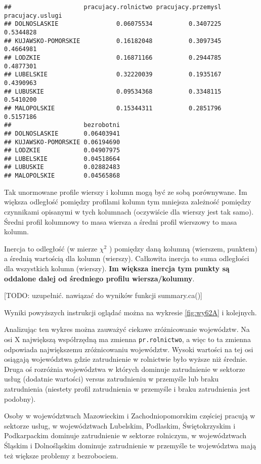 \documentclass[polish,]{book}
\begin{document}
\begin{verbatim}
##                    pracujacy.rolnictwo pracujacy.przemysl pracujacy.uslugi
## DOLNOSLASKIE                0.06075534          0.3407225        0.5344828
## KUJAWSKO-POMORSKIE          0.16182048          0.3097345        0.4664981
## LODZKIE                     0.16871166          0.2944785        0.4877301
## LUBELSKIE                   0.32220039          0.1935167        0.4390963
## LUBUSKIE                    0.09534368          0.3348115        0.5410200
## MALOPOLSKIE                 0.15344311          0.2851796        0.5157186
##                    bezrobotni
## DOLNOSLASKIE       0.06403941
## KUJAWSKO-POMORSKIE 0.06194690
## LODZKIE            0.04907975
## LUBELSKIE          0.04518664
## LUBUSKIE           0.02882483
## MALOPOLSKIE        0.04565868
\end{verbatim}

Tak unormowane profile wierszy i kolumn mogą być ze sobą porównywane. Im
większa odległość pomiędzy profilami kolumn tym mniejsza zależność pomiędzy
czynnikami opisanymi w tych kolumnach (oczywiście dla wierszy jest tak samo).
Średni profil kolumnowy to masa wiersza a średni profil wierszowy to masa kolumn.

Inercja to odległość (w mierze \(\chi^2\) ) pomiędzy daną kolumną (wierszem, punktem)
a średnią wartością dla kolumn (wierszy). Całkowita inercja to suma odległości dla
wszystkich kolumn (wierszy). \textbf{Im większa inercja tym punkty są oddalone
dalej od średniego profilu wiersza/kolumny}.

{[}TODO: uzupełnić. nawiązać do wyników funkcji summary.ca(){]}

Wyniki powyższych instrukcji oglądać można na wykresie \ref{fig:wy62A} i kolejnych.

Analizując ten wykres można zauważyć ciekawe zróżnicowanie województw. Na
osi X największą współrzędną ma zmienna \texttt{pr.rolnictwo}, a więc to ta zmienna odpowiada największemu zróżnicowaniu województw. Wysoki wartości na tej osi osiągają województwa gdzie zatrudnienie w rolnictwie było wyższe niż średnie. Druga
oś rozróżnia województwa w których dominuje zatrudnienie w sektorze usług (dodatnie wartości) versus zatrudnieniu w przemyśle lub braku zatrudnienia (niestety
profil zatrudnienia w przemyśle i braku zatrudnienia jest podobny).

Osoby w województwach Mazowieckim i Zachodniopomorskim częściej pracują
w sektorze usług, w województwach Lubelskim, Podlaskim, Świętokrzyskim i Podkarpackim dominuje zatrudnienie w sektorze rolniczym, w województwach Śląskim i
Dolnośląskim dominuje zatrudnienie w przemyśle te województwa mają też większe
problemy z bezrobociem.
\end{document}

